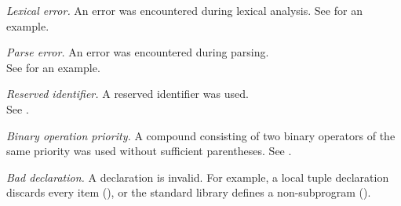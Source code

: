 \begin{description}
  \hypertarget{def-lexicalerrorcode}{}
  \item[$\LexicalError$]
    \textit{Lexical error.}
    An error was encountered during lexical analysis.
    See  for an example.

  \item[$\ParseError$]
    \textit{Parse error.}
    An error was encountered during parsing. \\
    See  for an example.

  \hypertarget{def-reservedidentifier}{}
  \item[$\ReservedIdentifier$]
    \textit{Reserved identifier.}
    A reserved identifier was used. \\
    See .

  \hypertarget{def-binoppriority}{}
  \item[$\BinopPriority$]
    \textit{Binary operation priority.}
    A compound \binopexpressionterm{} consisting of two binary operators of the same priority was used without sufficient parentheses.
    See .

  \hypertarget{def-buildbaddeclaration}{}
  \item[$\BuildBadDeclaration$]
    \textit{Bad declaration.}
    A declaration is invalid.
    For example, a local tuple declaration discards every item (),
    or the standard library defines a non-subprogram ().
\end{description}

